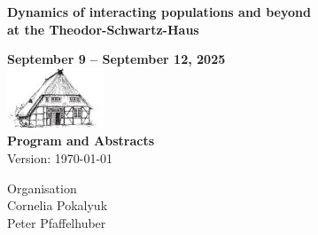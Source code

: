 \documentclass[12pt,a4paper]{article}
\begin{document}
\sffamily 

\thispagestyle{empty}

{%
\begin{center}
\vspace*{1cm}
\addtolength{\textheight}{3.5cm}

{\huge 
\textbf{Dynamics of interacting populations and beyond\\
       at the Theodor-Schwartz-Haus \\[2ex]
 }}
  
\bigskip\bigskip

\textbf{\large September 9 -- September 12, 2025}\\[4ex]
\includegraphics[scale=.4]{logo-tsh}\\[4ex]
\textbf{\large Program and Abstracts}\\[4ex]
Version: \today
\vfill

{Organisation}\\[1.0ex]
Cornelia Pokalyuk \\
Peter Pfaffelhuber\\[2ex]


\end{center}}
\end{document}

